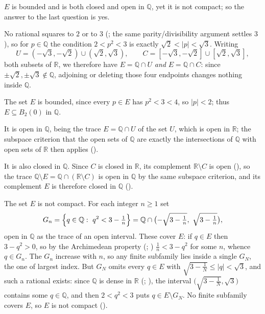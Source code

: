 \documentclass[main.tex]{subfiles}
\begin{document}
\begin{Solution}
$E$ is bounded and is both closed and open in $\mathbb Q$, yet it is not compact; so the answer to the
last question is yes.

No rational squares to $2$ or to $3$ (; the same parity/divisibility argument settles
$3$), so for $p\in\mathbb Q$ the condition $2<p^2<3$ is exactly $\sqrt2<|p|<\sqrt3$. Writing
\[
U=(-\sqrt3,-\sqrt2)\cup(\sqrt2,\sqrt3),\qquad
C=[-\sqrt3,-\sqrt2]\cup[\sqrt2,\sqrt3],
\]
both subsets of $\mathbb R$, we therefore have $E=\mathbb Q\cap U$ \emph{and} $E=\mathbb Q\cap C$: since
$\pm\sqrt2,\pm\sqrt3\notin\mathbb Q$, adjoining or deleting those four endpoints changes nothing inside
$\mathbb Q$.

The set $E$ is bounded, since every $p\in E$ has $p^2<3<4$, so $|p|<2$; thus $E\subseteq B_2(0)$ in
$\mathbb Q$.

It is open in $\mathbb Q$, being the trace $E=\mathbb Q\cap U$ of the set $U$, which is open in
$\mathbb R$; the subspace criterion that the open sets of $\mathbb Q$ are exactly the intersections of
$\mathbb Q$ with open sets of $\mathbb R$ then applies ().

It is also closed in $\mathbb Q$. Since $C$ is closed in $\mathbb R$, its complement $\mathbb R\setminus
C$ is open (), so the trace $\mathbb Q\setminus E=\mathbb Q\cap(\mathbb R\setminus C)$ is
open in $\mathbb Q$ by the same subspace criterion, and its complement $E$ is therefore closed in
$\mathbb Q$ ().

The set $E$ is not compact. For each integer $n\ge 1$ set
\[
G_n=\Bigl\{q\in\mathbb Q:\ q^2<3-\tfrac1n\Bigr\}=\mathbb Q\cap\bigl(-\sqrt{3-\tfrac1n},\ \sqrt{3-\tfrac1n}\bigr),
\]
open in $\mathbb Q$ as the trace of an open interval. These cover $E$: if $q\in E$ then $3-q^2>0$, so by
the Archimedean property (; ) $\tfrac1n<3-q^2$ for some
$n$, whence $q\in G_n$. The $G_n$ increase with $n$, so any finite subfamily lies inside a single
$G_N$, the one of largest index. But $G_N$ omits every $q\in E$ with $\sqrt{3-\tfrac1N}\le|q|<\sqrt3$,
and such a rational exists: since $\mathbb Q$ is dense in $\mathbb R$ (;
), the interval $\bigl(\sqrt{3-\tfrac1N},\sqrt3\bigr)$ contains some
$q\in\mathbb Q$, and then $2<q^2<3$ puts $q\in E\setminus G_N$. No finite subfamily covers $E$, so $E$
is not compact ().
\end{Solution}
\end{document}
